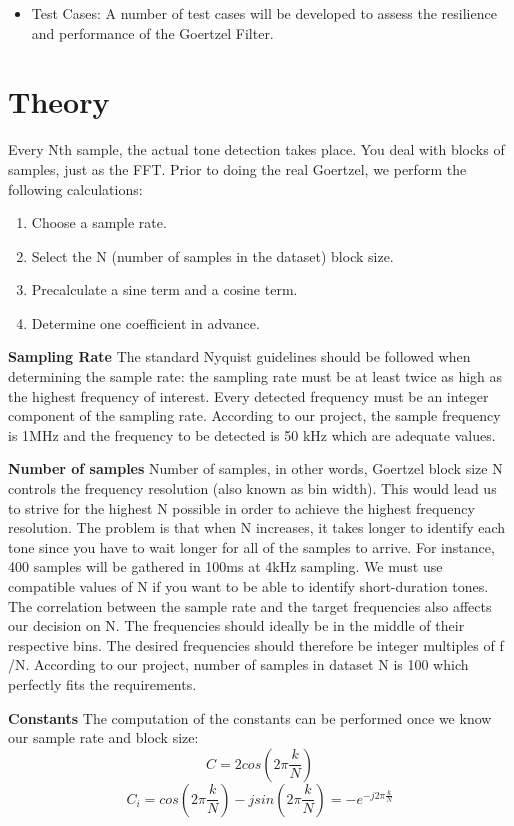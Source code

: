 \documentclass{article}
\begin{document}
\begin{itemize}
    \item Test Cases: A number of test cases will be developed to assess the resilience and performance of the Goertzel Filter.
\end{itemize}

\section{Theory}
Every Nth sample, the actual tone detection takes place. You deal with blocks of samples, just as the FFT. Prior to doing the real Goertzel, we perform the following calculations:
\begin{enumerate}
    \item Choose a sample rate.
    \item Select the N (number of samples in the dataset) block size.
    \item Precalculate a sine term and a cosine term.
    \item Determine one coefficient in advance.
\end{enumerate}

\textbf{Sampling Rate}
The standard Nyquist guidelines should be followed when determining the sample rate: the sampling rate must be at least twice as high as the highest frequency of interest. Every detected frequency must be an integer component of the sampling rate. According to our project, the sample frequency is 1MHz and the frequency to be detected is 50 kHz which are adequate values.

\textbf{Number of samples}
Number of samples, in other words, Goertzel block size N controls the frequency resolution (also known as bin width). This would lead us to strive for the highest N possible in order to achieve the highest frequency resolution. The problem is that when N increases, it takes longer to identify each tone since you have to wait longer for all of the samples to arrive. For instance, 400 samples will be gathered in 100ms at 4kHz sampling. We must use compatible values of N if you want to be able to identify short-duration tones. The correlation between the sample rate and the target frequencies also affects our decision on N. The frequencies should ideally be in the middle of their respective bins. The desired frequencies should therefore be integer multiples of f /N. According to our project, number of samples in dataset N is 100 which perfectly fits the requirements.

\textbf{Constants}
The computation of the constants can be performed once we know our sample rate and block size:
\[C=2cos(2\pi \frac{k}{N})\]
\[C_i=cos(2\pi \frac{k}{N})-jsin(2\pi \frac{k}{N})=-e^{-j2\pi \frac{k}{N}}\]
\end{document}
